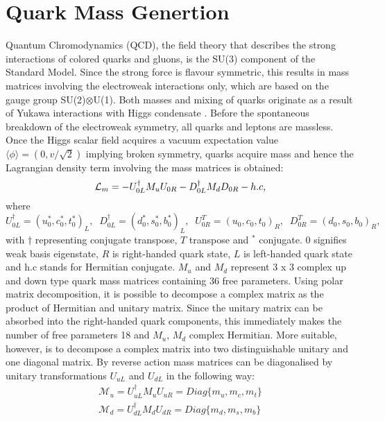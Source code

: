 \section{Quark Mass Genertion}
Quantum Chromodynamics (QCD), the field theory that describes the strong interactions of colored quarks and gluons, is the SU(3) component of the Standard Model. Since the strong force is flavour symmetric, this results in mass matrices involving the electroweak interactions only, which are based on the gauge group SU(2)$\otimes$U(1). Both masses and mixing of quarks originate as a result of Yukawa interactions with Higgs condensate \cite{ewconstraint}. Before the spontaneous breakdown of the electroweak symmetry, all quarks and leptons are massless. Once the Higgs scalar field acquires a vacuum expectation value $\langle\phi\rangle = (0, v/\sqrt{2})$ implying broken symmetry, quarks acquire mass and hence the Lagrangian density term involving the mass matrices\cite{texture} is obtained: 
\begin{equation}\label{lama}
{\cal L}_m= -U_{0L}^{\dagger}M_u U_{0R} - D_{0L}^{\dagger}M_dD_{0R} - h.c,
\end{equation}
where $U_{0L}^{\dagger}=(u_0^{*}, c_0^{*}, t_0^{*})_L,\;\; D_{0L}^{\dagger}=(d_0^{*},s_0^{*}, b_0^{*})_L,\;\; U_{0R}^T=(u_0,c_0,t_0)_R,\;\;D_{0R}^T=(d_0,s_0,b_0)_R,$ with $\dagger$ representing conjugate transpose, $T$ transpose and $^{*}$ conjugate. $0$ signifies weak basis eigenstate, $R$ is right-handed quark state, $L$ is left-handed quark state and h.c stands for Hermitian conjugate. $M_{u}$ and $M_{d}$ represent 3 x 3 complex up and down type quark mass matrices containing 36 free parameters. Using polar matrix decomposition, it is possible to decompose  a complex matrix as the product of Hermitian and unitary matrix. Since the unitary matrix can be absorbed into the right-handed quark components, this immediately makes the number of free parameters 18 and $M_{u}$, $M_{d}$  complex Hermitian.
\newline
\indent More suitable, however, is to decompose a complex matrix into two distinguishable unitary and one diagonal matrix. By reverse action mass matrices can be diagonalised by unitary transformations $U_{uL}$ and $ U_{dL}$ in the following way:
\begin{equation}
\begin{split}
\mathcal{M}_{u} = U_{uL}^{\dagger}M_{u}U_{uR} = Diag\{m_{u},m_{c},m_{t}\}
\\
\mathcal{M}_{d} = U_{dL}^{\dagger}M_{d}U_{dR} = Diag\{m_{d},m_{s},m_{b}\}
\end{split}
\end{equation}
